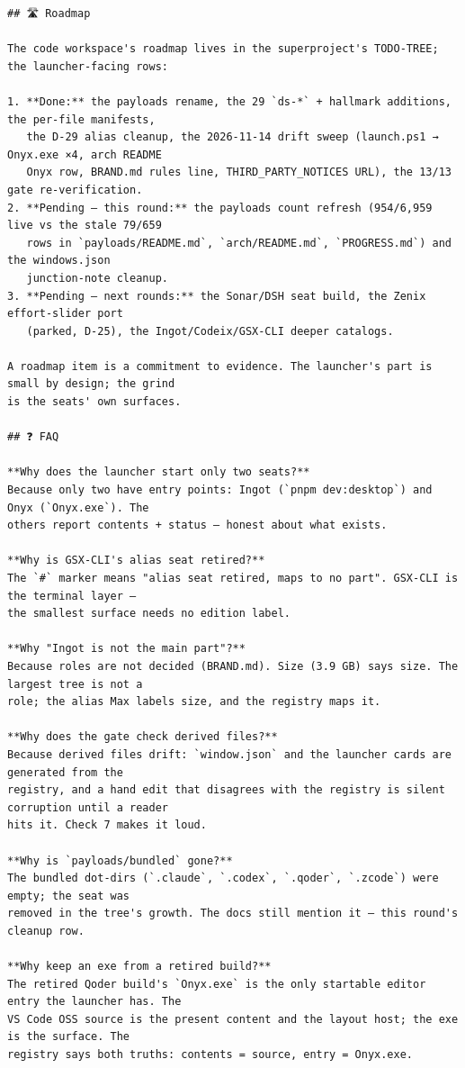 \begin{Verbatim}[breaklines,breakanywhere,fontsize=\footnotesize]
## 🛣️ Roadmap

The code workspace's roadmap lives in the superproject's TODO-TREE; the launcher-facing rows:

1. **Done:** the payloads rename, the 29 `ds-*` + hallmark additions, the per-file manifests,
   the D-29 alias cleanup, the 2026-11-14 drift sweep (launch.ps1 → Onyx.exe ×4, arch README
   Onyx row, BRAND.md rules line, THIRD_PARTY_NOTICES URL), the 13/13 gate re-verification.
2. **Pending — this round:** the payloads count refresh (954/6,959 live vs the stale 79/659
   rows in `payloads/README.md`, `arch/README.md`, `PROGRESS.md`) and the windows.json
   junction-note cleanup.
3. **Pending — next rounds:** the Sonar/DSH seat build, the Zenix effort-slider port
   (parked, D-25), the Ingot/Codeix/GSX-CLI deeper catalogs.

A roadmap item is a commitment to evidence. The launcher's part is small by design; the grind
is the seats' own surfaces.

## ❓ FAQ

**Why does the launcher start only two seats?**
Because only two have entry points: Ingot (`pnpm dev:desktop`) and Onyx (`Onyx.exe`). The
others report contents + status — honest about what exists.

**Why is GSX-CLI's alias seat retired?**
The `#` marker means "alias seat retired, maps to no part". GSX-CLI is the terminal layer —
the smallest surface needs no edition label.

**Why "Ingot is not the main part"?**
Because roles are not decided (BRAND.md). Size (3.9 GB) says size. The largest tree is not a
role; the alias Max labels size, and the registry maps it.

**Why does the gate check derived files?**
Because derived files drift: `window.json` and the launcher cards are generated from the
registry, and a hand edit that disagrees with the registry is silent corruption until a reader
hits it. Check 7 makes it loud.

**Why is `payloads/bundled` gone?**
The bundled dot-dirs (`.claude`, `.codex`, `.qoder`, `.zcode`) were empty; the seat was
removed in the tree's growth. The docs still mention it — this round's cleanup row.

**Why keep an exe from a retired build?**
The retired Qoder build's `Onyx.exe` is the only startable editor entry the launcher has. The
VS Code OSS source is the present content and the layout host; the exe is the surface. The
registry says both truths: contents = source, entry = Onyx.exe.


\end{Verbatim}
